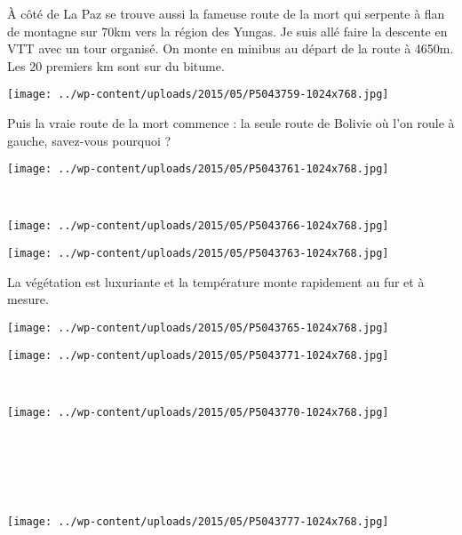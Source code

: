 À côté de La Paz se trouve aussi la fameuse route de la mort qui serpente à flan de montagne sur 70km vers la région des Yungas. Je suis allé faire la descente en VTT avec un tour organisé. On monte en minibus au départ de la route à 4650m. Les 20 premiers km sont sur du bitume. 
\begin{center} \texttt{[image: ../wp-content/uploads/2015/05/P5043759-1024x768.jpg]} \end{center}

Puis la vraie route de la mort commence : la seule route de Bolivie où l'on roule à gauche, savez-vous pourquoi ? 
\begin{center} \texttt{[image: ../wp-content/uploads/2015/05/P5043761-1024x768.jpg]} \end{center}
\vspace{-\topsep}
\pagebreak
~\\
\begin{center} \texttt{[image: ../wp-content/uploads/2015/05/P5043766-1024x768.jpg]} \end{center}
\begin{center} \texttt{[image: ../wp-content/uploads/2015/05/P5043763-1024x768.jpg]} \end{center}
\vspace{-\topsep}
\vspace{-3mm}
\pagebreak
La végétation est luxuriante et la température monte rapidement au fur et à mesure. 
\begin{center} \texttt{[image: ../wp-content/uploads/2015/05/P5043765-1024x768.jpg]} \end{center}
\begin{center} \texttt{[image: ../wp-content/uploads/2015/05/P5043771-1024x768.jpg]} \end{center}
\vspace{-\topsep}
\vspace{-3mm}
\pagebreak
~
\begin{center} \texttt{[image: ../wp-content/uploads/2015/05/P5043770-1024x768.jpg]} \end{center}
~\\~\\~\\
~\\
\begin{center} \texttt{[image: ../wp-content/uploads/2015/05/P5043777-1024x768.jpg]} \end{center}
\vspace{-\topsep}
\pagebreak


